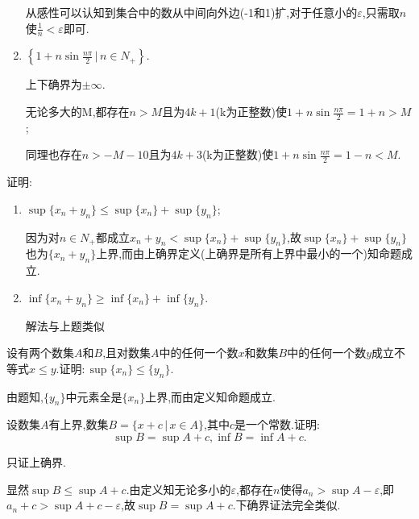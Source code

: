 \begin{exercise}
\begin{enumerate}
\begin{solution}
                       从感性可以认知到集合中的数从中间向外边(-1和1)扩,对于任意小的$\varepsilon$,只需取$n$使$\frac{1}{n}<\varepsilon$即可.
                   \end{solution}
             \item $\left\{1+n\sin\frac{n\pi}{2}\,\bigg\lvert\, n\in N_+\right\}$.
                   \begin{solution}
                       上下确界为$\pm \infty$.

                       无论多大的M,都存在$n>M$且为$4k+1$(k为正整数)使$1+n\sin\frac{n\pi}{2}=1+n>M$;

                       同理也存在$n>-M-10$且为$4k+3$(k为正整数)使$1+n\sin\frac{n\pi}{2}=1-n<M$.
                   \end{solution}
         \end{enumerate}
     \end{exercise}

     \begin{exercise}
         证明:
         \begin{enumerate}
             \item $\sup\{x_n+y_n\}\leqslant \sup\{x_n\}+\sup\{y_n\}$;
                   \begin{solution}
                       因为对$n\in N_+$都成立$x_n+y_n<\sup\{x_n\}+\sup\{y_n\}$,故$\sup\{x_n\}+\sup\{y_n\}$也为$\{x_n+y_n\}$上界,而由上确界定义(上确界是所有上界中最小的一个)知命题成立.
                   \end{solution}
             \item $\inf\{x_n+y_n\}\geqslant\inf\{x_n\}+\inf\{y_n\}$.
                   \begin{solution}
                       解法与上题类似
                   \end{solution}
         \end{enumerate}
     \end{exercise}

     \begin{exercise}
         设有两个数集$A$和$B$,且对数集$A$中的任何一个数$x$和数集$B$中的任何一个数$y$成立不等式$x\leqslant y$.证明:\,$\sup\{x_n\}\leqslant\{y_n\}$.
     \end{exercise}
     \begin{solution}
         由题知,$\{y_n\}$中元素全是$\{x_n\}$上界,而由定义知命题成立.
     \end{solution}

     \begin{exercise}
         设数集$A$有上界,数集$B=\{x+c\,\lvert\, x\in A\}$,其中$c$是一个常数.证明:\,
         \[
             \sup B=\sup A+c,\inf B=\inf A+c.
         \]
     \end{exercise}
     \begin{solution}
         只证上确界.

         显然$\sup B\leqslant\sup A+c$.由定义知无论多小的$\varepsilon$,都存在$n$使得$a_n>\sup A-\varepsilon$,即$a_n+c>\sup A+c-\varepsilon$,故$\sup B=\sup A+c$.下确界证法完全类似.
     \end{solution}

